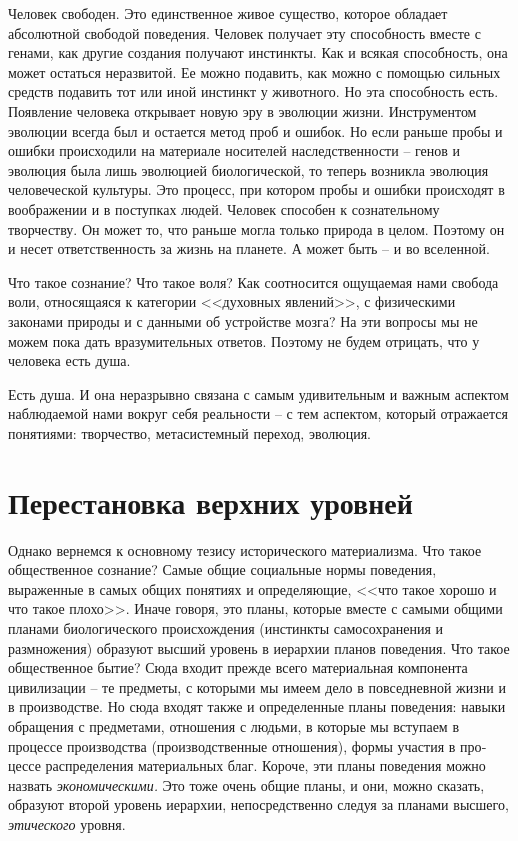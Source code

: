 \documentclass{book}
\begin{document}
Человек свободен. Это единственное живое существо, кото­рое обладает абсолютной свободой поведения. Человек полу­чает эту 
способность вместе с генами, как другие создания по­лучают инстинкты. Как и всякая способность, она может остать­ся неразвитой. Ее 
можно подавить, как можно с помощью сильных средств подавить тот или иной инстинкт у животного. Но эта способность есть.
Появление человека открывает новую эру в эволюции жиз­ни. Инструментом эволюции всегда был и остается метод проб и ошибок. Но 
если раньше пробы и ошибки происходили на материале носителей наследственности -- генов и эволюция была лишь эволюцией 
биологической, то теперь возникла эво­люция человеческой культуры. Это процесс, при котором про­бы и ошибки происходят в 
воображении и в поступках людей. Человек способен к сознательному творчеству. Он может то, что раньше могла только природа в 
целом. Поэтому он и несет ответственность за жизнь на планете. А может быть -- и во вселенной.

Что такое сознание? Что такое воля? Как соотносится ощу­щаемая нами свобода воли, относящаяся к категории <<духовных явлений>>, с 
физическими законами природы и с данными об устройстве мозга? На эти вопросы мы не можем пока дать вразумительных ответов. 
Поэтому не будем отрицать, что у человека есть душа.

Есть душа. И она неразрывно связана с самым удивительным и важным аспектом наблюдаемой нами вокруг себя реальности -- с тем аспектом, который отражается понятиями: творчество, метасистемный переход, эволюция.


\section{Перестановка верхних уровней}

Однако вернемся к основному тезису исторического материализма. Что такое общественное сознание? Самые общие социальные нормы 
поведения, выраженные в самых общих понятиях и определяющие, <<что такое хорошо и что такое плохо>>. Иначе говоря, это планы, 
которые вместе с самыми общими планами биологического происхождения (инстинкты самосохранения и размножения) образуют высший 
уровень в иерархии планов поведения. Что такое общественное бытие? Сюда входит прежде всего материальная компонента цивили­зации 
-- те предметы, с которыми мы имеем дело в повседнев­ной жизни и в производстве. Но сюда входят также и опреде­ленные планы 
поведения: навыки обращения с предметами, отношения с людьми, в которые мы вступаем в процессе произ­водства (производственные 
отношения), формы участия в про­цессе распределения материальных благ. Короче, эти планы по­ведения можно назвать 
\textit{экономическими.}  Это тоже очень общие планы, и они, можно сказать, образуют второй уровень иерар­хии, непосредственно 
следуя за планами высшего, \textit{этического} уровня.
\end{document}
